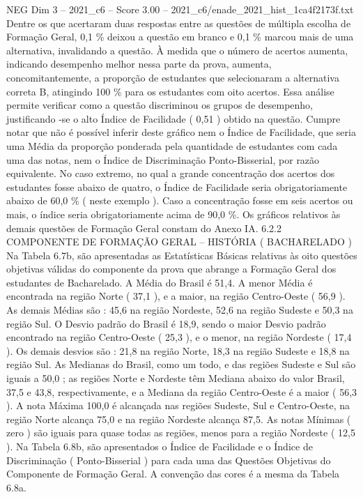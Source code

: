 \begin{textsample}{NEG Dim 3 – 2021\_c6 – Score 3.00 – 2021\_c6/enade\_2021\_hist\_1ca4f2173f.txt}
Dentre os que acertaram duas respostas entre as questões de múltipla escolha de Formação Geral, 0,1 \% deixou a questão em branco e 0,1 \% marcou mais de uma alternativa, invalidando a questão.
À medida que o número de acertos aumenta, indicando desempenho melhor nessa parte da prova, aumenta, concomitantemente, a proporção de estudantes que selecionaram a alternativa correta B, atingindo 100 \% para os estudantes com oito acertos.
Essa análise permite verificar como a questão discriminou os grupos de desempenho, justificando -se o alto Índice de Facilidade ( 0,51 ) obtido na questão.
Cumpre notar que não é possível inferir deste gráfico nem o Índice de Facilidade, que seria uma Média da proporção ponderada pela quantidade de estudantes com cada uma das notas, nem o Índice de Discriminação Ponto-Bisserial, por razão equivalente.
No caso extremo, no qual a grande concentração dos acertos dos estudantes fosse abaixo de quatro, o Índice de Facilidade seria obrigatoriamente abaixo de 60,0 \% ( neste exemplo ).
Caso a concentração fosse em seis acertos ou mais, o índice seria obrigatoriamente acima de 90,0 \%.
Os gráficos relativos às demais questões de Formação Geral constam do Anexo IA. 6.2.2 COMPONENTE DE FORMAÇÃO GERAL – HISTÓRIA ( BACHARELADO ) Na Tabela 6.7b, são apresentadas as Estatísticas Básicas relativas às oito questões objetivas válidas do componente da prova que abrange a Formação Geral dos estudantes de Bacharelado.
A Média do Brasil é 51,4.
A menor Média é encontrada na região Norte ( 37,1 ), e a maior, na região Centro-Oeste ( 56,9 ).
As demais Médias são : 45,6 na região Nordeste, 52,6 na região Sudeste e 50,3 na região Sul.
O Desvio padrão do Brasil é 18,9, sendo o maior Desvio padrão encontrado na região Centro-Oeste ( 25,3 ), e o menor, na região Nordeste ( 17,4 ).
Os demais desvios são : 21,8 na região Norte, 18,3 na região Sudeste e 18,8 na região Sul.
As Medianas do Brasil, como um todo, e das regiões Sudeste e Sul são iguais a 50,0 ; as regiões Norte e Nordeste têm Mediana abaixo do valor Brasil, 37,5 e 43,8, respectivamente, e a Mediana da região Centro-Oeste é a maior ( 56,3 ).
A nota Máxima 100,0 é alcançada nas regiões Sudeste, Sul e Centro-Oeste, na região Norte alcança 75,0 e na região Nordeste alcança 87,5.
As notas Mínimas ( zero ) são iguais para quase todas as regiões, menos para a região Nordeste ( 12,5 ).
Na Tabela 6.8b, são apresentados o Índice de Facilidade e o Índice de Discriminação ( Ponto-Bisserial ) para cada uma das Questões Objetivas do Componente de Formação Geral.
A convenção das cores é a mesma da Tabela 6.8a.

\end{textsample}
